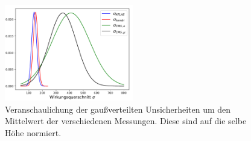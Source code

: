 \begin{figure}
  \centering
  \includegraphics[width=0.5\textwidth]{Plots/gauss.pdf}
  \caption{Veranschaulichung der gaußverteilten Unsicherheiten um den Mittelwert der verschiedenen Messungen. Diese sind auf die selbe Höhe normiert.}
  \label{fig:gau}
\end{figure}

